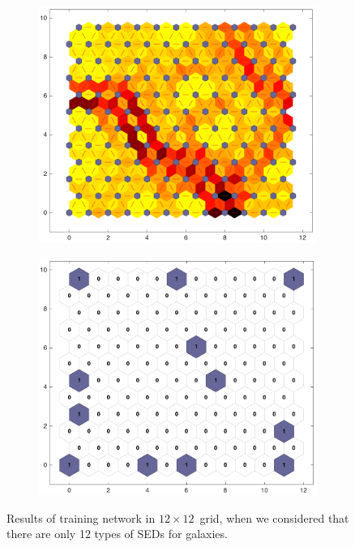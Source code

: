     \begin{figure}
        \begin{subfigure}[b]{0.5\textwidth}
            \centering
            \includegraphics[width=\textwidth]{../images/2d/dist_12_by_12.png}
        \end{subfigure}
        \hfill
        \begin{subfigure}[b]{0.5\textwidth}
            \includegraphics[width=\textwidth]{../images/2d/hit_t_12_by_12.png}
        \end{subfigure}
        \caption{Results of training network in $12\times12$~grid, when we considered that there are only 12 types of SEDs for galaxies.}
        \label{fig: 12by12T_newsom}
    \end{figure}
